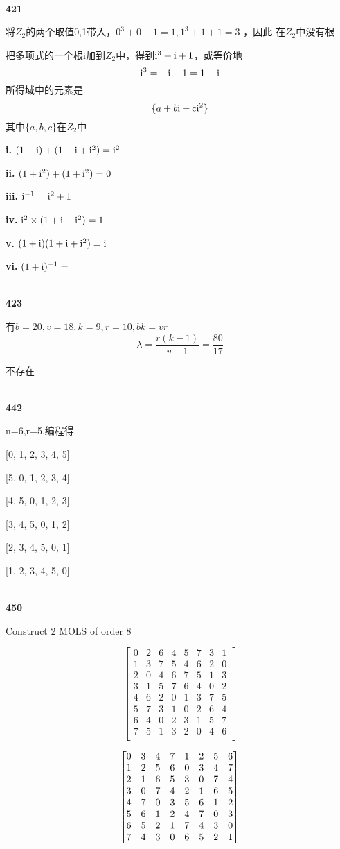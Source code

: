 \documentclass[UTF8]{ctexart}
\begin{document}
     ~\\
    \noindent\textbf{421}

    将$Z_2$的两个取值0,1带入，$0^3+0+1=1, 1^3+1+1=3$ ，因此
    在$Z_2$中没有根

    把多项式的一个根i加到$Z_2$中，得到$\rm{i^3+i+1}$，或等价地
    $$ \rm{i^3=-i-1=1+i}$$
    所得域中的元素是
    $$\{a+b\rm{i} +c\rm{i}^2 \}$$其中$\{a,b,c\}$在$Z_2$中
    
    \textbf{i. }
    $\rm{(1+i)+(1+i+i^2)=i^2}$

    \textbf{ii. }
    $\rm{(1+i^2)+(1+i^2)=0}$

    \textbf{iii. }
    $\rm{i^{-1}=i^2+1}$

    \textbf{iv. }
    $\rm{i^2 \times (1+i+i^2)=1}$

    \textbf{v. }
    $\rm{(1+i)(1+i+i^2)=i}$

    \textbf{vi. }
    $\rm{(1+i)^{-1}=}$

    ~\\
    \noindent\textbf{423}

    有$b = 20, v = 18, k = 9,  r = 10, bk=vr$
    $$\lambda=\frac{r(k-1)}{v-1}=\frac{80}{17}$$

    不存在

    ~\\
    \noindent\textbf{442}

    n=6,r=5,编程得

    [0, 1, 2, 3, 4, 5]

    [5, 0, 1, 2, 3, 4]

    [4, 5, 0, 1, 2, 3]

    [3, 4, 5, 0, 1, 2]

    [2, 3, 4, 5, 0, 1]

    [1, 2, 3, 4, 5, 0]

    ~\\
    \noindent\textbf{450}

    Construct 2 MOLS of order 8

    $$\begin{bmatrix}
0&2&6&4&5&7&3&1\\
1&3&7&5&4&6&2&0\\
2&0&4&6&7&5&1&3\\
3&1&5&7&6&4&0&2\\
4&6&2&0&1&3&7&5\\
5&7&3&1&0&2&6&4\\
6&4&0&2&3&1&5&7\\
7&5&1&3&2&0&4&6\\
    \end{bmatrix}$$

    $$
    \begin{bmatrix}
0&3&4&7&1&2&5&6\cr
1&2&5&6&0&3&4&7\cr
2&1&6&5&3&0&7&4\cr
3&0&7&4&2&1&6&5\cr
4&7&0&3&5&6&1&2\cr
5&6&1&2&4&7&0&3\cr
6&5&2&1&7&4&3&0\cr
7&4&3&0&6&5&2&1\cr
    \end{bmatrix}
    $$

    
\end{document}
